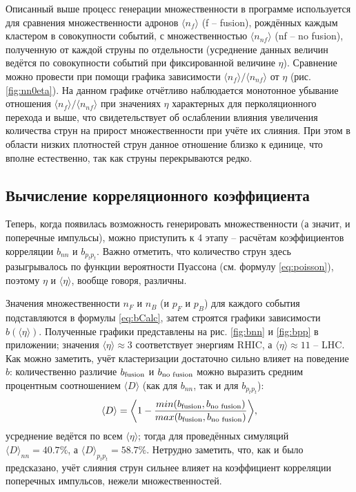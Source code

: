 Описанный выше процесс генерации множественности в программе используется для сравнения множественности адронов $\langle n_{f} \rangle$ (f -- fusion), рождённых каждым кластером в совокупности событий, с множественностью $\langle n_{nf} \rangle$ (nf -- no fusion), полученную от каждой струны по отдельности (усреднение данных величин ведётся по совокупности событий при фиксированной величине $\eta$). 
Сравнение можно провести при помощи графика зависимости $\langle n_{f} \rangle / \langle n_{nf} \rangle$ от $\eta$ (рис. \ref{fig:nn0eta}). 
На данном графике отчётливо наблюдается монотонное убывание отношения $\langle n_{f} \rangle / \langle n_{nf} \rangle$ при значениях $\eta$ характерных для перколяционного перехода и выше, что свидетельствует об ослаблении влияния увеличения количества струн на прирост множественности при учёте их слияния. При этом в области низких плотностей струн данное отношение близко к единице, что вполне естественно, так как струны перекрываются редко.
\subsection{Вычисление корреляционного коэффициента}
Теперь, когда появилась возможность генерировать множественности (а значит, и поперечные импульсы), можно приступить к 4 этапу -- расчётам коэффициентов корреляции $b_{nn}$ и $b_{p_tp_t}$.
Важно отметить, что количество струн здесь разыгрывалось по функции вероятности Пуассона (см. формулу \ref{eq:poisson}), поэтому $\eta$ и $\langle \eta \rangle$, вообще говоря, различны.

Значения множественности $n_F$ и $n_B$ (и $p_F$ и $p_B$) для каждого события подставляются в формулы \ref{eq:bCalc}, затем строятся графики зависимости $b(\langle \eta \rangle)$. Полученные графики представлены на рис. \ref{fig:bnn} и \ref{fig:bpp} в приложении; значения $\langle \eta \rangle \approx 3$ соответствует энергиям RHIC, а $\langle \eta \rangle \approx 11$ -- LHC. 
Как можно заметить, учёт кластеризации достаточно сильно влияет на поведение $b$: количественно различие $b_{\textnormal{fusion}}$ и $b_{\textnormal{no fusion}}$ можно выразить средним процентным соотношением $\langle D \rangle$ (как для $b_{nn}$, так и для $b_{p_tp_t}$):
\begin{equation} \label{eq:bfbn}
	\langle D \rangle = \bigg \langle 1 - \frac{min(b_{\textnormal{fusion}}, b_{\textnormal{no fusion}})}{max(b_{\textnormal{fusion}}, b_{\textnormal{no fusion}})} \bigg \rangle,
\end{equation}
усреднение ведётся по всем $\langle \eta \rangle$; тогда для проведённых симуляций $\langle D \rangle _{nn} = 40.7 \%$, а $\langle D \rangle _{p_tp_t} = 58.7 \%$. Нетрудно заметить, что, как и было предсказано, учёт слияния струн сильнее влияет на коэффициент корреляции поперечных импульсов, нежели множественностей.

